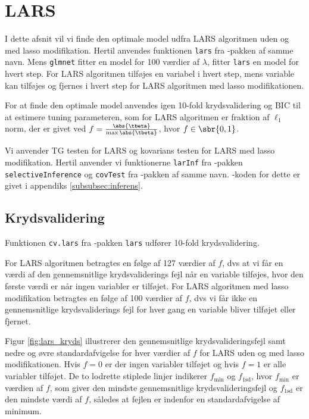 \section{LARS}
I dette afsnit vil vi finde den optimale model udfra LARS algoritmen uden og med lasso modifikation. 
Hertil anvendes funktionen \texttt{lars} fra \Rlang-pakken af samme navn.
Mens \texttt{glmnet} fitter en model for 100 værdier af \(\lambda\), fitter \texttt{lars} en model for hvert step.
For LARS algoritmen tilføjes en variabel i hvert step, mens variable kan tilføjes og fjernes i hvert step for LARS algoritmen med lasso modifikationen.

For at finde den optimale model anvendes igen 10-fold krydsvalidering og BIC til at estimere tuning parameteren, som for LARS algoritmen er fraktion af \(\ell_1\) norm, der er givet ved \(f = \frac{\abs{\tbeta}}{\max \abs{\tbeta}}\), hvor \(f \in \sbr{0,1}\).

Vi anvender TG testen for LARS og kovarians testen for LARS med lasso modifikation.   
Hertil anvender vi funktionerne \texttt{larInf} fra \Rlang-pakken \texttt{selectiveInference} og \texttt{covTest} fra \Rlang-pakken af samme navn. 
\Rlang-koden for dette er givet i appendiks \ref{subsubsec:inferens}.


\subsection{Krydsvalidering}
Funktionen \texttt{cv.lars} fra \Rlang-pakken \texttt{lars} udfører 10-fold krydsvalidering.

For LARS algoritmen betragtes en følge af 127 værdier af $f$, dvs at vi får en værdi af den gennemsnitlige krydsvaliderings fejl når en variable tilføjes, hvor den første værdi er når ingen variabler er tilføjet. 
For LARS algoritmen med lasso modifikation betragtes en følge af 100 værdier af $f$, dvs vi får ikke en gennemsnitlige krydsvaliderings fejl for hver gang en variable bliver tilføjet eller fjernet. 

Figur \ref{fig:lars_kryds} illustrerer den gennemsnitlige krydsvalideringsfejl samt nedre og øvre standardafvigelse for hver værdier af $f$ for LARS uden og med lasso modifikationen.
Hvis $f = 0$ er der ingen variabler tilføjet og hvis $f=1$ er alle variabler tilføjet. 
De to lodrette stiplede linjer indikerer \(f_{\text{min}}\) og \(f_\text{1sd}\), hvor \(f_{\text{min}}\) er værdien af \(f\), som giver den mindste gennemsnitlige krydsvalideringsfejl og \(f_\text{1sd}\) er den mindste værdi af \(f\), således at fejlen er indenfor en standardafvigelse af minimum. 

